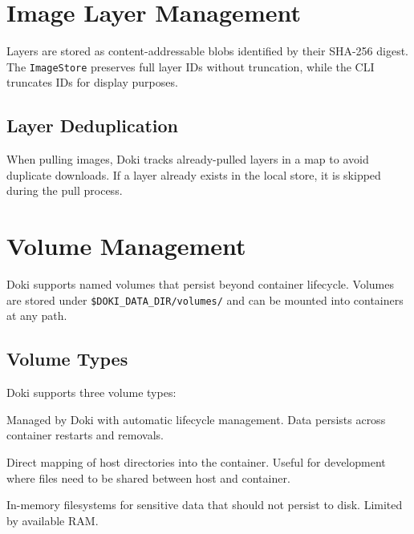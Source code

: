 \section{Image Layer Management}
\label{sec:layer-management}

Layers are stored as content-addressable blobs identified by their
SHA-256 digest. The \texttt{ImageStore} preserves full layer IDs
without truncation, while the CLI truncates IDs for display purposes.

\subsection{Layer Deduplication}
\label{sec:layer-dedup}

When pulling images, Doki tracks already-pulled layers in a map to
avoid duplicate downloads. If a layer already exists in the local
store, it is skipped during the pull process.

\section{Volume Management}
\label{sec:volume-management}

Doki supports named volumes that persist beyond container lifecycle.
Volumes are stored under \texttt{\$DOKI\_DATA\_DIR/volumes/} and can
be mounted into containers at any path.

\subsection{Volume Types}
\label{sec:volume-types}

Doki supports three volume types:

\begin{description}[leftmargin=*, style=nextline, font=\sffamily\bfseries]
  \item[Named volumes.]
    Managed by Doki with automatic lifecycle management. Data persists
    across container restarts and removals.

  \item[Bind mounts.]
    Direct mapping of host directories into the container. Useful for
    development where files need to be shared between host and
    container.

  \item[tmpfs mounts.]
    In-memory filesystems for sensitive data that should not persist
    to disk. Limited by available RAM.
\end{description}

